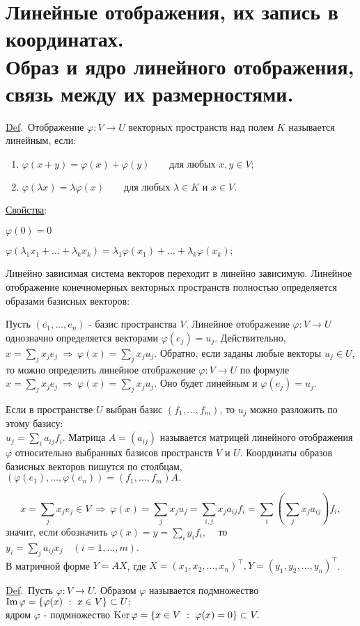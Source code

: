 \documentclass[a4paper]{article}%
\renewcommand{\de}{\par\noindent\underline{Def}.\ }%
\renewcommand{\ab}{\par\noindent}%
\renewcommand{\phi}{\varphi}
\newcommand{\baz}[1]{\left(#1_1,\dots,#1_n\right)}%
\renewcommand{\nn}[1]{#1_1,#1_2,\dots,#1_n}%
\begin{document}
\section{Линейные отображения, их запись в координатах.\\ Образ и ядро линейного отображения,\\ связь между их размерностями.}
\label{q6} %
\de Отображение $\phi :V\rightarrow U$ векторных пространств над полем $K$ называется линейным, если:
\begin{enumerate}
    \item $\phi(x+y)=\phi(x)+\phi(y)\qquad\mbox{для любых }x,y\in V;$
    \item $\phi(\lambda x)=\lambda\phi(x)\qquad\mbox{для любых }\lambda\in K\mbox{ и }x\in V.$
\end{enumerate}
\ab \underline{Свойства}: %
\ab $\phi(0)=0$ %
\ab $\phi\left(\lambda_1x_1+\dots+\lambda_kx_k\right)=\lambda_1\phi(x_1)+\dots+\lambda_k\phi(x_k);$ %
\ab Линейно зависимая система векторов переходит в линейно зависимую. %
Линейное отображение конечномерных векторных пространств полностью определяется образами базисных векторов: %
\ab Пусть $\baz{e}$ - базис пространства $V$. Линейное отображение $\phi :V\rightarrow U$ однозначно
определяется векторами $\phi(e_j)=u_j.$ Действительно, $x=\sum\limits_jx_je_j\ \Rightarrow\
\phi(x)=\sum\limits_jx_ju_j.$ Обратно, если заданы любые векторы $u_j\in U$, то можно определить линейное
отображение $\phi :V\rightarrow U$ по формуле $x=\sum\limits_jx_je_j\ \Rightarrow\ \phi(x)=\sum\limits_jx_ju_j.$
Оно будет линейным и $\phi(e_j)=u_j.$%
\ab Если в пространстве $U$ выбран базис $(f_1,\dots,f_m)$, то $u_j$ можно разложить по этому базису:\\%
$u_j=\sum\limits_ia_{ij}f_i$. Матрица $A=\left(a_{ij}\right)$ называется матрицей линейного отображения $\phi$
относительно выбранных базисов пространств $V$ и $U$. Координаты образов базисных векторов пишутся по столбцам,
$(\phi(e_1),\dots,\phi(e_n))=(f_1,\dots,f_m)A.$ %
\ab $$x=\sum\limits_jx_je_j\in V\ \Rightarrow\ \phi(x)=\sum\limits_jx_ju_j=\sum\limits_{i,j}x_ja_{ij}f_i=%
\sum\limits_i\left(\sum\limits_jx_ja_{ij}\right)f_i,$$ значит, если обозначить $\phi(x)=y=\sum\limits_iy_if_i$, \
\ то\ \  $y_i=\sum\limits_ja_{ij}x_j\quad(i=1,\dots,m)$. \\ В матричной форме $Y=AX$, где $X=(\nn{x})^\top,
Y=(\nn{y})^\top$. %
\de Пусть $\phi :V\rightarrow U$. Образом $\phi$ называется подмножество ${\rm Im\,}\phi=\left\{\phi(x)\ :\ x\in V
\right\}\subset U;$\\ ядром $\phi$ - подмножество ${\rm Ker\,}\phi=\left\{x\in V\ :\ \phi(x)=0\right\}\subset V.$
\end{document}
